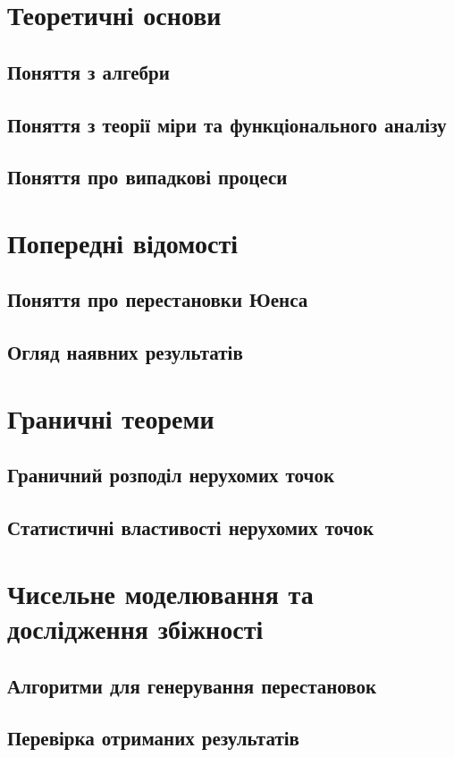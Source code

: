 





\tableofcontents
{}
    
\chapter{Теоретичні основи}
    \section{Поняття з алгебри}
        
    \section{Поняття з теорії міри та функціонального аналізу}
        
    \section{Поняття про випадкові процеси}
        
\chapter{Попередні відомості}
    \section{Поняття про перестановки Юенса}
    \section{Огляд наявних результатів}
\chapter{Граничні теореми}
    \section{Граничний розподіл нерухомих точок}
        
    \section{Статистичні властивості нерухомих точок}
        
\chapter{Чисельне моделювання та дослідження збіжності}
    \section{Алгоритми для генерування перестановок}
        
    \section{Перевірка отриманих результатів}
        
\newpage


